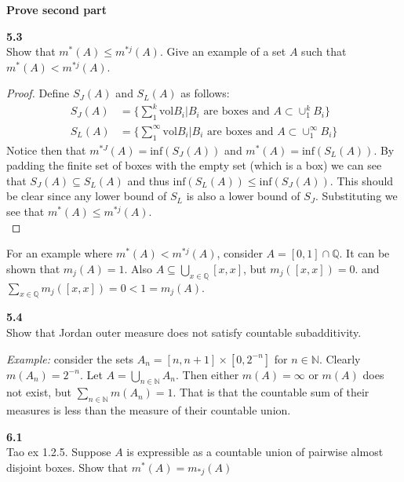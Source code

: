 \documentclass[12pt]{article}
\newcommand{\problem}[1]{\hspace{-4 ex} \large \textbf{#1}\\}
\begin{document}
	\textbf{Prove second part}



\problem{5.3} Show that $m^*(A)\leq m^{*j}(A)$. Give an example of a set $A$ such that $m^*(A)<m^{*j}(A)$.
	
	\begin{proof}
		Define $S_J(A)$ and $S_L(A)$ as follows:
		\begin{align*}
			S_J(A) & = \Bigg\{\sum_1^k\text{vol}B_i \Bigg \vert B_i \text{ are boxes and } A \subset \cup_1^k B_i \Bigg\} \\
			S_L(A) & = \Bigg\{\sum_1^\infty\text{vol}B_i \Bigg \vert B_i \text{ are boxes and } A \subset \cup_1^\infty B_i \Bigg\}
		\end{align*}
	Notice then that $m^{*J}(A) = \text{inf}(S_J(A))$ and $m^{*}(A) = \text{inf}(S_L(A))$. By padding the finite set of boxes with the empty set (which is a box) we can see that $S_J(A) \subseteq S_L(A)$ and thus $\text{inf}(S_L(A)) \leq \text{inf}(S_J(A))$. This should be clear since any lower bound of $S_L$ is also a lower bound of $S_J$. Substituting we see that $m^*(A)\leq m^{*j}(A)$. \\
	\end{proof}
	
	For an example where $m^*(A)<m^{*j}(A)$, consider $A = [0,1] \cap \mathbb{Q}$. It can be shown that $m_j(A)=1$. Also $A \subseteq \bigcup\limits_{x \in \mathbb{Q}}[x,x]$, but $m_j([x,x])=0$. and $\sum\limits_{x \in \mathbb{Q}}m_j([x,x]) = 0 < 1 = m_j(A)$. 
	


\problem{5.4} Show that Jordan outer measure does not satisfy countable subadditivity.

	\textit{Example:} consider the sets $A_n = [n,n+1] \times [0, 2^{-n}]$ for $n \in \mathbb{N}$. Clearly $m(A_n) = 2^{-n}$. Let $A = \bigcup\limits_{n \in \mathbb{N}}A_n$. Then either $m(A) = \infty$ or $m(A)$ does not exist, but $\sum\limits_{n \in \mathbb{N}}m(A_n) = 1$. That is that the countable sum of their measures is less than the measure of their countable union.



\problem{6.1}Tao ex 1.2.5. Suppose $A$ is expressible as a countable union of pairwise almost disjoint boxes. Show that $m^*(A)=m_{*j}(A)$
\end{document}
